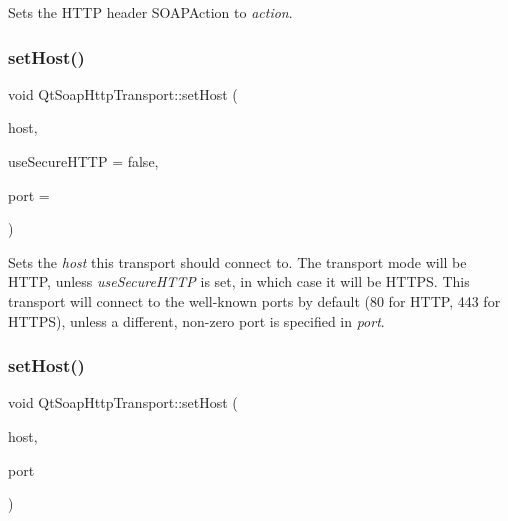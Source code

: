 Sets the H\+T\+TP header S\+O\+A\+P\+Action to {\itshape action}. \mbox{\label{class_qt_soap_http_transport_a7dfb69fe0e076407cda0093ee99c4988}} 
\subsubsection{\texorpdfstring{set\+Host()}{setHost()}\hspace{0.1cm}{\footnotesize\ttfamily [1/2]}}
{\footnotesize\ttfamily void Qt\+Soap\+Http\+Transport\+::set\+Host (\begin{DoxyParamCaption}\item[{const Q\+String \&}]{host,  }\item[{bool}]{use\+Secure\+H\+T\+TP = {\ttfamily false},  }\item[{int}]{port = {} }\end{DoxyParamCaption})}

Sets the {\itshape host} this transport should connect to. The transport mode will be H\+T\+TP, unless {\itshape use\+Secure\+H\+T\+TP} is set, in which case it will be H\+T\+T\+PS. This transport will connect to the well-\/known ports by default (80 for H\+T\+TP, 443 for H\+T\+T\+PS), unless a different, non-\/zero port is specified in {\itshape port}. \mbox{\label{class_qt_soap_http_transport_afb8d7fa9d30b5ec0dc2857818c5c1b0a}} 
\subsubsection{\texorpdfstring{set\+Host()}{setHost()}\hspace{0.1cm}{\footnotesize\ttfamily [2/2]}}
{\footnotesize\ttfamily void Qt\+Soap\+Http\+Transport\+::set\+Host (\begin{DoxyParamCaption}\item[{const Q\+String \&}]{host,  }\item[{int}]{port }\end{DoxyParamCaption})}

\mbox{\label{class_qt_soap_http_transport_a6b49c608e9eb6af98b7258c8a59c5005}} 
